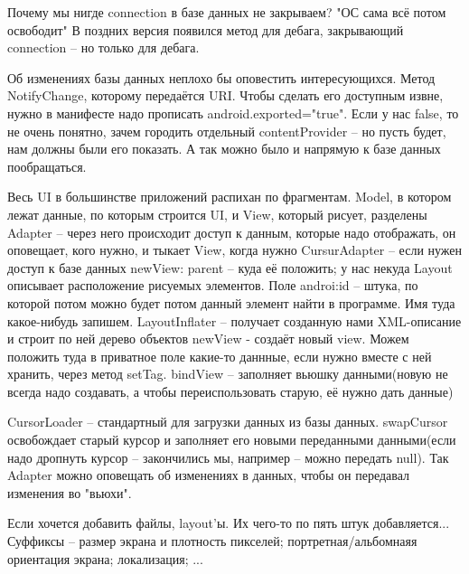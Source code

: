 Почему мы нигде connection  в базе данных не закрываем?
"ОС сама всё потом освободит"
В поздних версия появился метод для дебага, закрывающий connection -- но только для дебага.

Об изменениях базы данных неплохо бы оповестить интересующихся. Метод NotifyChange, которому передаётся URI.
Чтобы сделать его доступным извне, нужно в манифесте надо прописать android.exported="true".
Если у нас false, то не очень понятно, зачем городить отдельный contentProvider -- но пусть будет, нам должны были его показать.
А так можно было и напрямую к базе данных пообращаться.

Весь UI в большинстве приложений распихан по фрагментам.
Model, в котором лежат данные, по которым строится UI, и View, который рисует, разделены
Adapter -- через него происходит доступ к данным, которые надо отображать, он оповещает, кого нужно, и тыкает View, когда нужно 
CursurAdapter -- если нужен доступ к базе данных
newView:
parent -- куда её положить; у нас некуда
Layout описывает расположение рисуемых элементов.
Поле androi:id -- штука, по которой потом можно будет потом данный элемент найти в программе. Имя туда какое-нибудь запишем.
LayoutInflater -- получает созданную нами XML-описание и строит по ней дерево объектов
newView - создаёт новый view. Можем положить туда в приватное поле какие-то даннные, если нужно вместе с ней хранить, через метод setTag.
bindView -- заполняет вьюшку данными(новую не всегда надо создавать, а чтобы переиспользовать старую, её нужно дать данные)

CursorLoader -- стандартный для загрузки данных из базы данных.
swapCursor освобождает старый курсор и заполняет его новыми переданными данными(если надо дропнуть курсор -- закончились мы, например --
можно передать null). Так Adapter можно оповещать об изменениях в данных, чтобы он передавал изменения во "вьюхи".

Если хочется добавить файлы, layout'ы. Их чего-то по пять штук добавляется...
Суффиксы -- размер экрана и плотность пикселей; портретная/альбомнаяя ориентация экрана; локализация; ...
